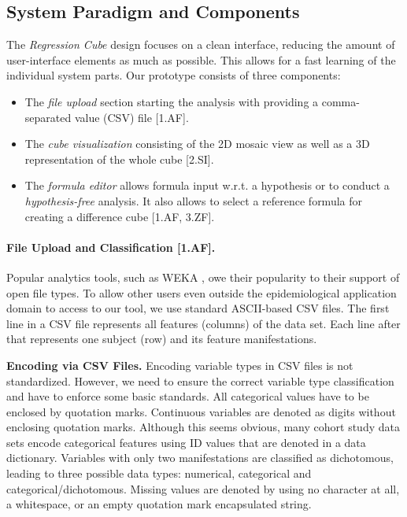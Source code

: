 \documentclass[journal]{style/vgtc} 			          %
\begin{document}
\subsection{System Paradigm and Components}
The \emph{Regression Cube} design focuses on a clean interface, reducing the amount of user-interface elements as much as possible.
This allows for a fast learning of the individual system parts.
Our prototype consists of three components:
\begin{itemize}
	\item The \emph{file upload} section starting the analysis with providing a comma-separated value (CSV) file [1.AF].
	\item The \emph{cube visualization} consisting of the 2D mosaic view as well as a 3D representation of the whole cube [2.SI].
	\item The \emph{formula editor} allows formula input w.r.t. a hypothesis or to conduct a \emph{hypothesis-free} analysis.
	It also allows to select a reference formula for creating a difference cube [1.AF, 3.ZF].
\end{itemize}
\paragraph{File Upload and Classification [1.AF].}
Popular analytics tools, such as WEKA \cite{WEKA}, owe their popularity to their support of open file types.
To allow other users even outside the epidemiological application domain to access to our tool, we use standard ASCII-based CSV files.
The first line in a CSV file represents all features (columns) of the data set.
Each line after that represents one subject (row) and its feature manifestations.

\textbf{Encoding via CSV Files.}
Encoding variable types in CSV files is not standardized.
However, we need to ensure the correct variable type classification and have to enforce some basic standards.
All categorical values have to be enclosed by quotation marks.
Continuous variables are denoted as digits without enclosing quotation marks.
Although this seems obvious, many cohort study data sets encode categorical features using ID values that are denoted in a data dictionary.
Variables with only two manifestations are classified as dichotomous, leading to three possible data types: numerical, categorical and categorical/dichotomous.
Missing values are denoted by using no character at all, a whitespace, or an empty quotation mark encapsulated string.
\end{document}
